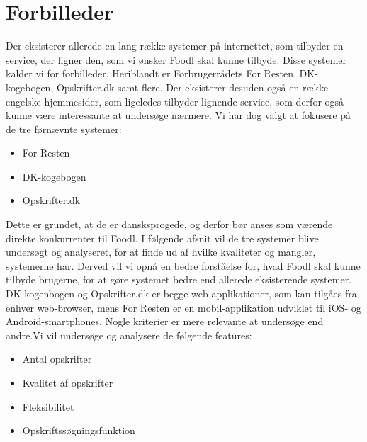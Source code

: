 \section{Forbilleder}
Der eksisterer allerede en lang række systemer på internettet, som tilbyder en service, der ligner den, som vi ønsker Foodl skal kunne tilbyde. Disse systemer kalder vi for forbilleder. Heriblandt er Forbrugerrådets For Resten, DK-kogebogen, Opskrifter.dk samt flere. Der eksisterer desuden også en række engelske hjemmesider, som ligeledes tilbyder lignende service, som derfor også kunne være interessante at undersøge nærmere. Vi har dog valgt at fokusere på de tre førnævnte systemer: 

\begin{itemize}[noitemsep]
\item For Resten
\item DK-kogebogen
\item Opskrifter.dk
\end{itemize}

Dette er grundet, at de er dansksprogede, og derfor bør anses som værende direkte konkurrenter til Foodl. I følgende afsnit vil de tre systemer blive undersøgt og analyseret, for at finde ud af hvilke kvaliteter og mangler, systemerne har. Derved vil vi opnå en bedre forståelse for, hvad Foodl skal kunne tilbyde brugerne, for at gøre systemet bedre end allerede eksisterende systemer. DK-kogenbogen og Opskrifter.dk er begge web-applikationer, som kan tilgåes fra enhver web-browser, mens For Resten er en mobil-applikation udviklet til iOS- og Android-smartphones. Nogle kriterier er mere relevante at undersøge end andre.Vi vil undersøge og analysere de følgende features:

\begin{itemize}[noitemsep]
\item Antal opskrifter
\item Kvalitet af opskrifter
\item Fleksibilitet
\item Opskriftssøgningsfunktion
\end{itemize}

